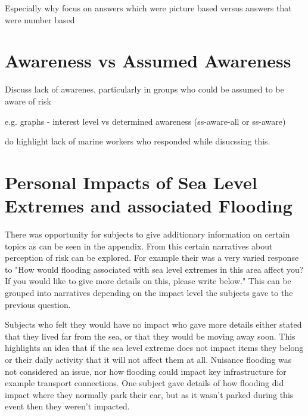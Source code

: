Especially why focus on answers which were picture based versus answers that were number based



\section{Awareness vs Assumed Awareness}
Discuss lack of awarenes, particularly in groups who could be assumed to be aware of risk

e.g. graphs - interest level vs determined awareness (ss-aware-all or ss-aware)

do highlight lack of marine workers who responded while disucssing this. 

\section{Personal Impacts of Sea Level Extremes and associated Flooding}
There was opportunity for subjects to give additionary information on certain topics as can be seen in the appendix. From this certain narratives about perception of risk can be explored. For example their was a very varied response to "How would flooding associated with sea level extremes in this area affect you? If you would like to give more details on this, please write below." This can be grouped into narratives depending on the impact level the subjects gave to the previous question.

Subjects who felt they would have no impact who gave more details either stated that they lived far from the sea, or that they would be moving away soon. This highlights an idea that if the sea level extreme does not impact items they belong or their daily activity that it will not affect them at all. Nuisance flooding was not considered an issue, nor how flooding could impact key infrastructure for example transport connections. One subject gave details of how flooding did impact where they normally park their car, but as it wasn't parked during this event then they weren't impacted. 


